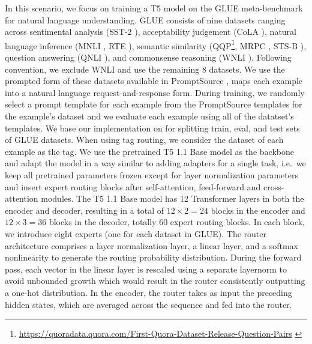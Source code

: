\documentclass{article}
\theoremstyle{plain}
\theoremstyle{definition}
\theoremstyle{remark}
\begin{document}
In this scenario, we focus on training a T5 model \citep{raffel2020exploring} on the GLUE meta-benchmark \citep{wang2018glue} for natural language understanding. 
GLUE consists of nine datasets ranging across sentimental analysis (SST-2 \citep{socher2013recursive}), acceptability judgement (CoLA \citep{warstadt2019neural}), natural language inference (MNLI \citep{williams2017broad}, RTE \citep{bentivogli2009fifth}), semantic similarity (QQP\footnote{\url{https://quoradata.quora.com/First-Quora-Dataset-Release-Question-Pairs} \label{qqp-source}}, MRPC \citep{dolan2005automatically}, STS-B \citep{cer2017semeval}), question answering (QNLI \citep{rajpurkar2016squad}), and commonsense reasoning (WNLI \citep{levesque2012winograd}).
Following convention, we exclude WNLI and use the remaining 8 datasets. 
We use the prompted form of these datasets available in PromptSource \citep{bach2022promptsource}, maps each example into a natural language request-and-response form.
During training, we randomly select a prompt template for each example from the PromptSource templates for the example's dataset and we evaluate each example using all of the datatset's templates.
We base our implementation on \citet{mahabadi2021parameter} for splitting train, eval, and test sets of GLUE datasets.
When using tag routing, we consider the dataset of each example as the tag.
We use the pretrained T5 1.1 Base model as the backbone and adapt the model in a way similar to adding adapters \citep{houlsby2019parameter} for a single task, i.e.\ we keep all pretrained parameters frozen except for layer normalization parameters and insert expert routing blocks after self-attention, feed-forward and cross-attention modules.
The T5 1.1 Base model has 12 Transformer layers in both the encoder and decoder, resulting in a total of $12\times2 = 24$ blocks in the encoder and $12 \times 3 = 36$ blocks in the decoder, totally 60 expert routing blocks.
In each block, we introduce eight experts (one for each dataset in GLUE).
The router architecture comprises a layer normalization layer, a linear layer, and a softmax nonlinearity to generate the routing probability distribution.
During the forward pass, each vector in the linear layer is rescaled using a separate layernorm to avoid unbounded growth which would result in the router consistently outputting a one-hot distribution.
In the encoder, the router takes as input the preceding hidden states, which are averaged across the sequence and fed into the router. 
\end{document}
